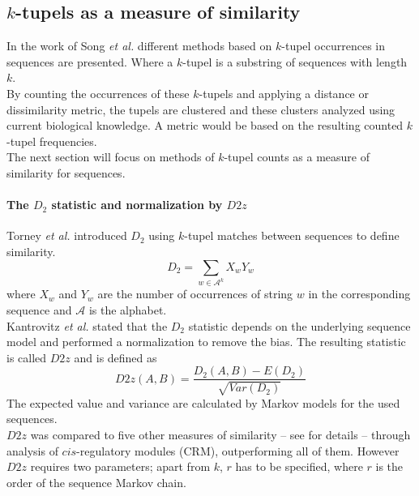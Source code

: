 \documentclass[twocolumn]{bmcart}%
\begin{document}
\subsection*{$k$-tupels as a measure of similarity}
In the work of Song \textit{et al.}\cite{doi:10.1093/bib/bbt067} different methods based on $k$-tupel occurrences in sequences are presented. Where a $k$-tupel is a substring of sequences with length $k$.\\
By counting the occurrences of these $k$-tupels and applying a distance or dissimilarity metric, the tupels are clustered and these clusters analyzed using current biological knowledge. A metric would be based on the resulting counted $k$-tupel frequencies.\\
The next section will focus on methods of $k$-tupel counts as a measure of similarity for sequences.
\paragraph*{The $D_2$ statistic and normalization by $D2z$}
Torney \textit{et al.}\cite{torney1990computation} introduced $D_2$  using $k$-tupel matches between sequences to define similarity.
$$D_2=\sum_{w\in \mathcal{A}^k}X_wY_w$$
where $X_w$ and $Y_w$ are the number of occurrences of string $w$ in the corresponding sequence and $ \mathcal{A}$ is the alphabet.\\
Kantrovitz \textit{et al.}\cite{kantorovitz2007statistical} stated that the $D_2$ statistic depends on the  underlying sequence model and performed a normalization to remove the bias. The resulting statistic is called $D2z$ and is defined as
$$D2z(A,B)=\frac{D_2(A,B)-E(D_2)}{\sqrt{Var(D_2)}}$$
The expected value and variance are calculated by Markov models for the used sequences.\\
$D2z$ was compared to five other measures of similarity -- see \cite{doi:10.1093/bib/bbt067}\cite{kantorovitz2007statistical} for details -- through analysis of $cis$-regulatory modules (CRM), outperforming all of them. However $D2z$ requires two parameters; apart from $k$, $r$ has to be specified, where $r$ is the order of the sequence Markov chain.
\end{document}
